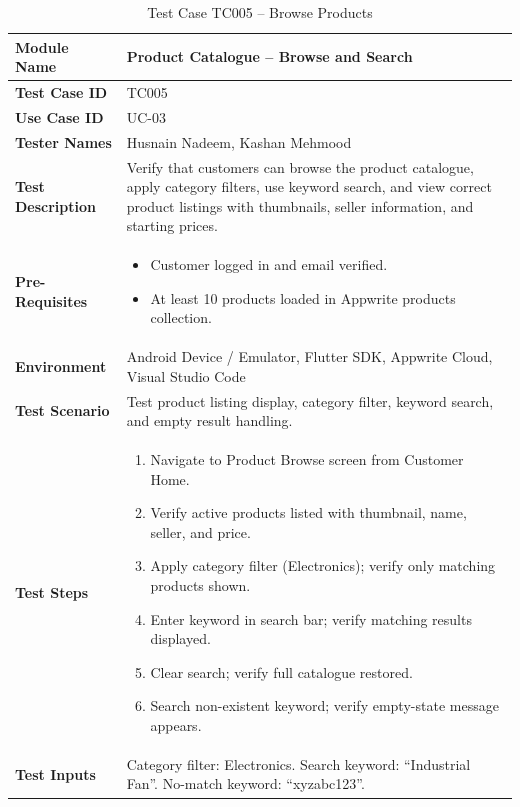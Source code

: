 \begin{table}[H]
\centering
\caption{Test Case TC005 -- Browse Products}
\label{tab:tc005}
\renewcommand{\arraystretch}{1.15}
\small
\begin{tabular}{|p{3.2cm}|p{10.8cm}|}
\hline
\textbf{Module Name} & Product Catalogue -- Browse and Search \\ \hline
\textbf{Test Case ID} & TC005 \\ \hline
\textbf{Use Case ID} & UC-03 \\ \hline
\textbf{Tester Names} & Husnain Nadeem, Kashan Mehmood \\ \hline
\textbf{Test Description} & Verify that customers can browse the product catalogue, apply category filters, use keyword search, and view correct product listings with thumbnails, seller information, and starting prices. \\ \hline
\textbf{Pre-Requisites} &
\begin{itemize}[leftmargin=*,noitemsep]
\item Customer logged in and email verified.
\item At least 10 products loaded in Appwrite products collection.
\end{itemize} \\ \hline
\textbf{Environment} & Android Device / Emulator, Flutter SDK, Appwrite Cloud, Visual Studio Code \\ \hline
\textbf{Test Scenario} & Test product listing display, category filter, keyword search, and empty result handling. \\ \hline
\textbf{Test Steps} &
\begin{enumerate}[leftmargin=*,noitemsep]
\item Navigate to Product Browse screen from Customer Home.
\item Verify active products listed with thumbnail, name, seller, and price.
\item Apply category filter (Electronics); verify only matching products shown.
\item Enter keyword in search bar; verify matching results displayed.
\item Clear search; verify full catalogue restored.
\item Search non-existent keyword; verify empty-state message appears.
\end{enumerate} \\ \hline
\textbf{Test Inputs} & Category filter: Electronics. Search keyword: ``Industrial Fan''. No-match keyword: ``xyzabc123''. \\ \hline

\end{tabular}
\end{table}
